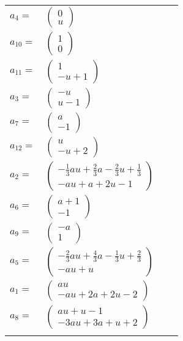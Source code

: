 \documentclass[1p]{elsarticle_modified}
\theoremstyle{definition}
\begin{document}
\begin{tabular}{m{7pt} m{180pt} m{7pt} m{180pt} }
\flushright $a_{4}=$&$\begin{pmatrix}0\\u\end{pmatrix}$ \\
\flushright $a_{10}=$&$\begin{pmatrix}1\\0\end{pmatrix}$ \\
\flushright $a_{11}=$&$\begin{pmatrix}1\\- u+1\end{pmatrix}$ \\
\flushright $a_{3}=$&$\begin{pmatrix}- u\\u-1\end{pmatrix}$ \\
\flushright $a_{7}=$&$\begin{pmatrix}a\\-1\end{pmatrix}$ \\
\flushright $a_{12}=$&$\begin{pmatrix}u\\- u+2\end{pmatrix}$ \\
\flushright $a_{2}=$&$\begin{pmatrix}-\frac{1}{3} a u+\frac{2}{3} a-\frac{2}{3} u+\frac{1}{3}\\- a u+a+2 u-1\end{pmatrix}$ \\
\flushright $a_{6}=$&$\begin{pmatrix}a+1\\-1\end{pmatrix}$ \\
\flushright $a_{9}=$&$\begin{pmatrix}- a\\1\end{pmatrix}$ \\
\flushright $a_{5}=$&$\begin{pmatrix}-\frac{2}{3} a u+\frac{4}{3} a-\frac{1}{3} u+\frac{2}{3}\\- a u+u\end{pmatrix}$ \\
\flushright $a_{1}=$&$\begin{pmatrix}a u\\- a u+2 a+2 u-2\end{pmatrix}$ \\
\flushright $a_{8}=$&$\begin{pmatrix}a u+u-1\\-3 a u+3 a+u+2\end{pmatrix}$\\&\end{tabular}
\end{document}
